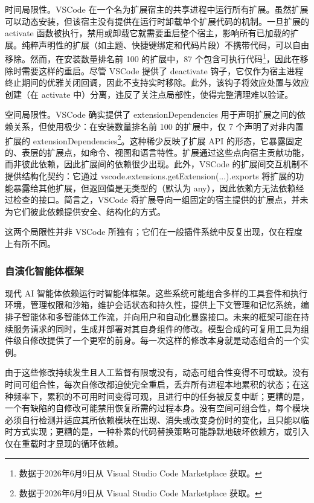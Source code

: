 时间局限性。VSCode 在一个名为扩展宿主的共享进程中运行所有扩展。虽然扩展可以动态安装，但该宿主没有提供在运行时卸载单个扩展代码的机制。一旦扩展的 activate 函数被执行，禁用或卸载它就需要重启整个宿主，影响所有已加载的扩展。纯粹声明性的扩展（如主题、快捷键绑定和代码片段）不携带代码，可以自由移除。然而，在安装数量排名前 100 的扩展中，87 个包含可执行代码\footnote{数据于2026年6月9日从 Visual Studio Code Marketplace 获取。}，因此在移除时需要这样的重启。尽管 VSCode 提供了 deactivate 钩子，它仅作为宿主进程终止期间的优雅关闭回调，因此不支持实时移除。此外，该钩子将效应处置与效应创建（在 activate 中）分离，违反了关注点局部性，使得完整清理难以验证。

空间局限性。VSCode 确实提供了 extensionDependencies 用于声明扩展之间的依赖关系，但使用极少：在安装数量排名前 100 的扩展中，仅 7 个声明了对非内置扩展的 extensionDependencies\footnote{数据于2026年6月9日从 Visual Studio Code Marketplace 获取。}。这种稀少反映了扩展 API 的形态，它暴露固定的、表层的扩展点，如命令、视图和语言特性。扩展通过这些点向宿主贡献功能，而非彼此依赖，因此扩展间的依赖很少出现。此外，VSCode 的扩展间交互机制不提供结构化契约：它通过 vscode.extensions.getExtension(...).exports 将扩展的功能暴露给其他扩展，但返回值是无类型的（默认为 any），因此依赖方无法依赖经过检查的接口。简言之，VSCode 将扩展导向一组固定的宿主提供的扩展点，并未为它们彼此依赖提供安全、结构化的方式。

这两个局限性并非 VSCode 所独有；它们在一般插件系统中反复出现\cite{ref2,ref7}，仅在程度上有所不同。

\subsubsection{自演化智能体框架}
\label{sec:1.2.2}

现代 AI 智能体依赖运行时智能体框架\cite{ref8,ref9,ref10}。这些系统可能组合多样的工具套件\cite{ref11}和执行环境，管理权限和沙箱，维护会话状态和持久性，提供上下文管理和记忆系统\cite{ref12}，编排子智能体和多智能体工作流\cite{ref13}，并向用户和自动化暴露接口。未来的框架可能在持续服务请求的同时，生成并部署对其自身组件的修改。模型合成的可复用工具为组件级自修改提供了一个更窄的前身\cite{ref14}。每一次这样的修改本身就是动态组合的一个实例。

由于这些修改持续发生且人工监督有限或没有，动态可组合性变得不可或缺。没有时间可组合性，每次自修改都迫使完全重启，丢弃所有进程本地累积的状态；在这种频率下，累积的不可用时间变得可观，且进行中的任务被反复中断；更糟的是，一个有缺陷的自修改可能禁用恢复所需的过程本身。没有空间可组合性，每个模块必须自行检测并适应其所依赖模块在出现、消失或改变身份时的变化，且只能以临时方式实现；更糟的是，一种朴素的代码替换策略可能静默地破坏依赖方，或引入仅在重载时才显现的循环依赖。

